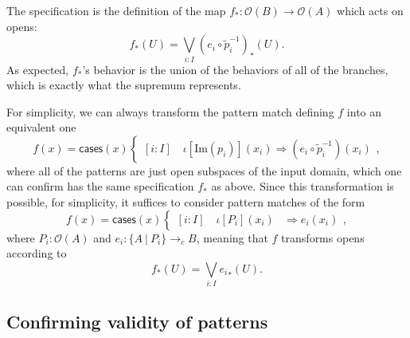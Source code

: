 \documentclass[conference]{IEEEtran}
\newcommand{\cto}{\to_c}
\newcommand{\suchthat}{\ |\ }
\newcommand{\Open}[1]{\mathcal{O}({#1})}
\newcommand{\Img}[1]{\text{Im}\left({#1}\right)}
\newcommand{\oinclf}[1]{\iota[{#1}]}
\newcommand{\oincl}[2]{\oinclf{#1} \left({#2}\right)}
\newcommand{\Branch}{\Rightarrow}
\begin{document}
The specification is the definition of the map $f_* : \Open{B} \to \Open{A}$ which acts on opens:
\[
f_*(U) = \bigvee_{i : I} (e_i \circ \tilde{p}_i^{-1})_*(U).
\]
As expected, $f_*$'s behavior is the union of the behaviors of all of the branches, which is exactly what the supremum represents.

For simplicity, we can always transform the pattern match defining $f$ into an equivalent one
\[
f(x) = \mathsf{cases}(x)
\begin{cases}
[i : I] \quad \oincl{\Img{p_i}}{x_i} \Branch (e_i \circ \tilde{p}_i^{-1})(x_i)
\end{cases},
\]
where all of the patterns are just open subspaces of the input domain, which one can confirm has the same specification $f_*$ as above. Since this transformation is possible, for simplicity, it suffices to consider pattern matches of the form
\[
f(x) = \mathsf{cases}(x)
\begin{cases}
[i : I] \quad \oincl{P_i}{x_i} &\Branch e_i(x_i)
\end{cases},
\]
where $P_i : \Open{A}$ and $e_i : \{ A \suchthat P_i \} \cto B$, meaning that $f$ transforms opens according to
\[
f_*(U) = \bigvee_{i : I} {e_i}_*(U).
\]

\subsection{Confirming validity of patterns}
\end{document}
